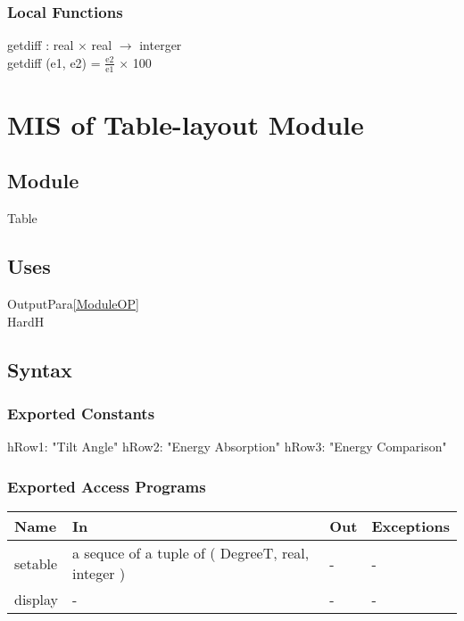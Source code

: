 \documentclass[12pt, titlepage]{article}
\begin{document}
\subsubsection{Local Functions}
getdiff : real $\times$ real $\rightarrow$ interger\\
getdiff (e1, e2) =
$\frac{\text{e2}}{\text{e1}}$ $\times$ 100


\section{MIS of Table-layout Module} \label{ModuleT} 

\subsection{Module}
Table\\

\subsection{Uses}
OutputPara\ref{ModuleOP}\\
HardH\\


\subsection{Syntax}

\subsubsection{Exported Constants}

hRow1: "Tilt Angle"
hRow2: "Energy Absorption"
hRow3: "Energy Comparison"

\subsubsection{Exported Access Programs}

\begin{center}
\begin{tabular}{p{2cm} p{5cm} p{5cm} p{2cm}}
\hline
\textbf{Name} & \textbf{In} & \textbf{Out} & \textbf{Exceptions} \\
\hline 
setable & a sequce of a tuple of ( DegreeT, real, integer ) & - & - \\
display & - & - & - \\

\hline
\end{tabular}
\end{center}
\end{document}
